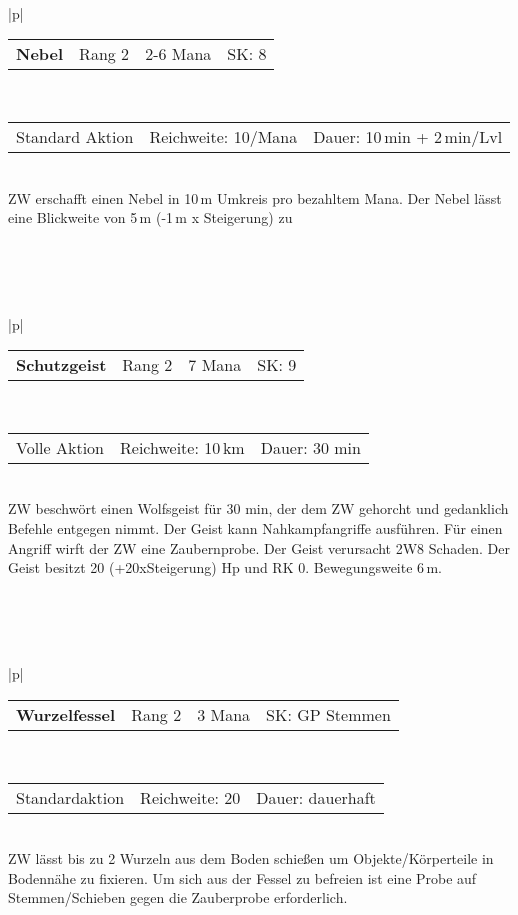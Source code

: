 \documentclass[../../Heldenanleitung2]{subfiles}
\begin{document}
\\\\\\
\begin{tabular}{|p{\textwidth}|}
\hline
\begin{tabularx}{\textwidth}{X|X|X|X}
\textbf{Nebel} & Rang 2 & 2-6 Mana & SK: 8
\end{tabularx} \\ \hline
\begin{tabularx}{\textwidth}{X|X|X}
Standard Aktion & Reichweite: 10/Mana & Dauer: 10\,min + 2\,min/Lvl
\end{tabularx} \\ \hline
ZW erschafft einen Nebel in 10\,m Umkreis pro bezahltem Mana. Der Nebel lässt eine Blickweite von 5\,m (-1\,m x Steigerung) zu
\\ \hline
\end{tabular}
\\\\\\
\begin{tabular}{|p{\textwidth}|}
\hline
\begin{tabularx}{\textwidth}{X|X|X|X}
\textbf{Schutzgeist} & Rang 2 & 7 Mana & SK: 9
\end{tabularx} \\ \hline
\begin{tabularx}{\textwidth}{X|X|X}
Volle Aktion & Reichweite: 10\,km & Dauer: 30 min
\end{tabularx} \\ \hline
ZW beschwört einen Wolfsgeist für 30 min, der dem ZW gehorcht und gedanklich Befehle entgegen nimmt. Der Geist kann Nahkampfangriffe ausführen. Für einen Angriff wirft der ZW eine Zaubernprobe. Der Geist verursacht 2W8 Schaden. Der Geist besitzt 20 (+20xSteigerung) Hp und RK 0. Bewegungsweite 6\,m.
\\ \hline
\end{tabular}
\\\\\\
\begin{tabular}{|p{\textwidth}|}
\hline
\begin{tabularx}{\textwidth}{X|X|X|X}
\textbf{Wurzelfessel} & Rang 2 & 3 Mana & SK: GP Stemmen
\end{tabularx} \\ \hline
\begin{tabularx}{\textwidth}{X|X|X}
Standardaktion & Reichweite: 20 & Dauer: dauerhaft
\end{tabularx} \\ \hline
ZW lässt bis zu 2 Wurzeln aus dem Boden schießen um Objekte/Körperteile in Bodennähe zu fixieren. Um sich aus der Fessel zu befreien ist eine Probe auf Stemmen/Schieben gegen die Zauberprobe erforderlich.
\\ \hline
\end{tabular}
\end{document}
